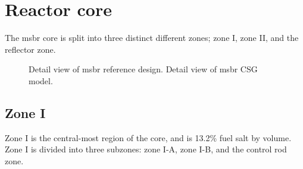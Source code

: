 \section{Reactor core}
\label{sec:msbr-core}
The \Gls{msbr} core is split into three distinct different zones; zone I, zone
II, and the reflector zone. 

\begin{figure}[htpb]
    \centering
    \caption[Detail views of MSBR core region]{
         Detail view of \Gls{msbr} reference design.
         Detail view of \Gls{msbr} CSG model.}
    \label{fig:msbr-detail}
\end{figure}

\subsection{Zone I} Zone I is the central-most region of the core, and is 13.2\%
fuel salt by volume. Zone I is divided into three subzones: zone I-A, zone I-B,
and the control rod zone.

